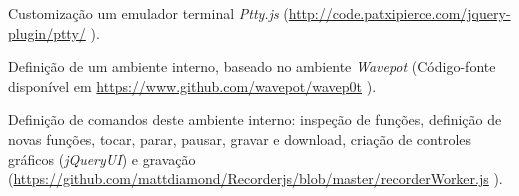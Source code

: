 \begin{inparaenum}
\item Customização um emulador terminal \emph{Ptty.js} (\footnotesize \url{http://code.patxipierce.com/jquery-plugin/ptty/} \normalsize).
\item Definição de um ambiente interno, baseado no ambiente \emph{Wavepot} (Código-fonte disponível em \footnotesize \url{https://www.github.com/wavepot/wavep0t} \normalsize).
\item Definição de comandos deste ambiente interno: inspeção de funções, definição de novas funções, tocar, parar, pausar, gravar e download, criação de controles gráficos (\emph{jQueryUI}) e gravação (\footnotesize \url{https://github.com/mattdiamond/Recorderjs/blob/master/recorderWorker.js} \normalsize).
\end{inparaenum}

